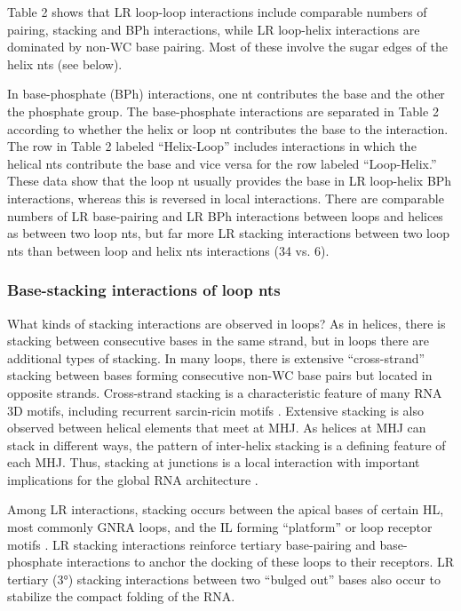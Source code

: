 Table 2 shows that LR loop-loop interactions include comparable numbers of
pairing, stacking and BPh interactions, while LR loop-helix interactions are
dominated by non-WC base pairing. Most of these involve the sugar edges of the
helix nts (see below). 

In base-phosphate (BPh) interactions, one nt contributes the base and the other
the phosphate group. The base-phosphate interactions are separated in Table 2
according to whether the helix or loop nt contributes the base to the
interaction. The row in Table 2 labeled ``Helix-Loop'' includes interactions in
which the helical nts contribute the base and vice versa for the row labeled
``Loop-Helix.'' These data show that the loop nt usually provides the base in LR
loop-helix BPh interactions, whereas this is reversed in local interactions.
There are comparable numbers of LR base-pairing and LR BPh interactions between
loops and helices as between two loop nts, but far more LR stacking interactions
between two loop nts than between loop and helix nts interactions (34 vs. 6). 

\subsubsection{Base-stacking interactions of loop nts}

What kinds of stacking interactions are observed in loops? As in helices, there
is stacking between consecutive bases in the same strand, but in loops there are
additional types of stacking. In many loops, there is extensive “cross-strand”
stacking between bases forming consecutive non-WC base pairs but located in
opposite strands. Cross-strand stacking is a characteristic feature of many RNA
3D motifs, including recurrent sarcin-ricin motifs \cite{Szewczak1993a}.
Extensive stacking is also observed between helical elements that meet at MHJ.
As helices at MHJ can stack in different ways, the pattern of inter-helix
stacking is a defining feature of each MHJ. Thus, stacking at junctions is a
local interaction with important implications for the global RNA architecture
\cite{Lescoute2006b}. 

Among LR interactions, stacking occurs between the apical bases of certain HL,
most commonly GNRA loops, and the IL forming ``platform'' or loop receptor motifs
\cite{Cate1996}. LR stacking interactions reinforce tertiary base-pairing and
base-phosphate interactions to anchor the docking of these loops to their
receptors. LR tertiary (3°) stacking interactions between two “bulged out” bases
also occur to stabilize the compact folding of the RNA. 

